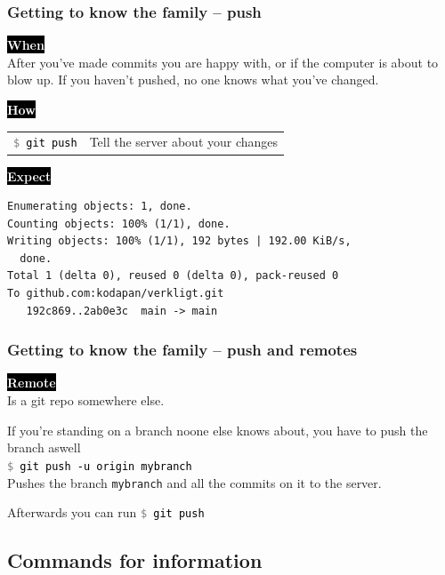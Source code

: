 \documentclass{beamer}
\newcommand{\keyword}[1]{\hspace{-1.0em}\colorbox{black}{\textcolor{white}{\textbf{#1}\vphantom{Ep}}}\vspace{0.2em}} %
\newcommand{\command}[1]{\colorbox{black!90!white!10!}{\vphantom{Ep}\texttt{\textcolor{gray}{\$} \textcolor{black}{#1}}}}
\begin{document}
\begin{frame}[fragile]
  \frametitle{Getting to know the family -- push}
  \keyword{When}\\
    After you've made commits you are happy with, or if the computer
    is about to blow up. If you haven't pushed, no one knows what
    you've changed. \\
  \vspace{0.5em}

  \keyword{How}\\
  \hspace{-0.95em}
  \begin{tabular}{ll}
    \command{git push} & Tell the server about your changes \\
  \end{tabular}
  \vspace{0.5em}

  \keyword{Expect}\\ [0.1em]
\begin{verbatim}
Enumerating objects: 1, done.
Counting objects: 100% (1/1), done.
Writing objects: 100% (1/1), 192 bytes | 192.00 KiB/s,
  done.
Total 1 (delta 0), reused 0 (delta 0), pack-reused 0
To github.com:kodapan/verkligt.git
   192c869..2ab0e3c  main -> main
\end{verbatim}
\end{frame}

\begin{frame}[fragile]
  \frametitle{Getting to know the family -- push and remotes}
  \keyword{Remote}\\
  Is a git repo somewhere else. \\
  \vspace{1em}

  If you're standing on a branch noone else knows about, you have
  to push the branch aswell\\
  \vspace{1em}
  \command{git push -u origin mybranch} \\
  Pushes the branch \texttt{mybranch} and all the
  commits on it to the server.
  \vspace{1em}

  Afterwards you can run \command{git push}

\end{frame}

\subsection{Commands for information}
\end{document}
